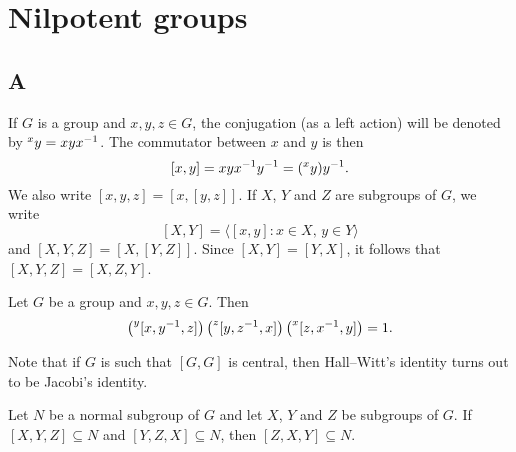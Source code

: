 \chapter{Nilpotent groups}

\section*{A}

If $G$ is a group and $x,y,z\in G$, the conjugation (as a left action) will be denoted
by $\prescript{x}{}y=xyx^{-1}$. The commutator between $x$ and $y$ is then 
\[
[x,y]=xyx^{-1}y^{-1}=(\prescript{x}{}y)y^{-1}.
\]
We also write 
$[x,y,z]=[x,[y,z]]$. 
If $X$, $Y$ and $Z$ are subgroups of $G$, we write 
\[
[X,Y]=\langle [x,y]:x\in X,\,y\in Y\rangle
\]
and $[X,Y,Z]=\left[ X,[Y,Z] \right]$. Since $[X,Y]=[Y,X]$, it follows that  
$[X,Y,Z]=[X,Z,Y]$. 

\begin{exercise}
	\label{xca:HallWitt}
	Let $G$ be a group and $x,y,z\in G$. Then 
	\begin{equation}
		\label{eq:HallWitt}
	\left(\prescript{y}{}[x,y^{-1},z]\right)\left(\prescript{z}{}[y,z^{-1},x]\right)\left(\prescript{x}{}[z,x^{-1},y]\right)=1.
	\end{equation}
\end{exercise}

Note that if $G$ is such that $[G,G]$ is central, then Hall--Witt's identity 
turns out to be Jacobi's identity. 

%

\begin{lemma}
	\label{lemma:3subgrupos_general}
	Let $N$ be a normal subgroup of $G$ and let $X$, $Y$ and $Z$
	be subgroups of $G$. If $[X,Y,Z]\subseteq N$ and $[Y,Z,X]\subseteq N$, then 
	$[Z,X,Y]\subseteq N$.
\end{lemma}

